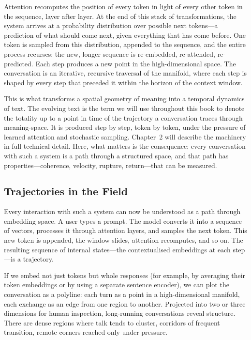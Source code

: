 Attention recomputes the position of every token in light of every other token in the sequence, layer after layer. At the end of this stack of transformations, the system arrives at a probability distribution over possible next tokens---a prediction of what should come next, given everything that has come before. One token is sampled from this distribution, appended to the sequence, and the entire process recurses: the new, longer sequence is re-embedded, re-attended, re-predicted. Each step produces a new point in the high-dimensional space. The conversation is an iterative, recursive traversal of the manifold, where each step is shaped by every step that preceded it within the horizon of the context window.

This is what transforms a spatial geometry of meaning into a temporal dynamics of text. The evolving text is the term we will use throughout this book to denote the totality up to a point in time of the trajectory a conversation traces through meaning-space. It is produced step by step, token by token, under the pressure of learned attention and stochastic sampling. Chapter~2 will describe the machinery in full technical detail. Here, what matters is the consequence: every conversation with such a system is a path through a structured space, and that path has properties---coherence, velocity, rupture, return---that can be measured.

\subsection{Trajectories in the Field}

Every interaction with such a system can now be understood as a path through embedding space. A user types a prompt. The model converts it into a sequence of vectors, processes it through attention layers, and samples the next token. This new token is appended, the window slides, attention recomputes, and so on. The resulting sequence of internal states---the contextualised embeddings at each step---is a trajectory.

If we embed not just tokens but whole responses (for example, by averaging their token embeddings or by using a separate sentence encoder), we can plot the conversation as a polyline: each turn as a point in a high-dimensional manifold, each exchange as an edge from one region to another. Projected into two or three dimensions for human inspection, long-running conversations reveal structure. There are dense regions where talk tends to cluster, corridors of frequent transition, remote corners reached only under pressure.

